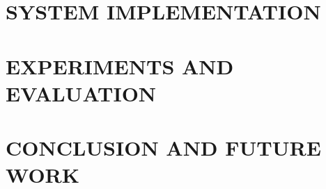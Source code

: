 \documentclass[a4paper,twoside]{report}
\theoremstyle{definition}
\begin{document}
\newpage
\chapter{SYSTEM IMPLEMENTATION}


\newpage
\chapter{EXPERIMENTS AND EVALUATION}


\newpage
\chapter{CONCLUSION AND FUTURE WORK}


\newpage
{}
\printbibliography[title={REFERENCES}]
\end{document}
